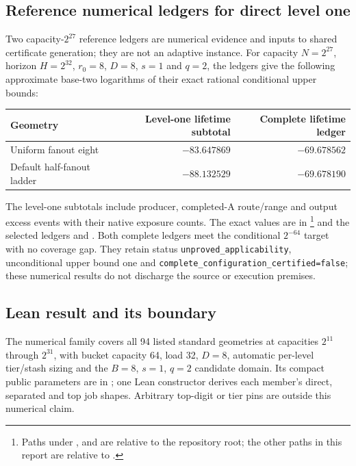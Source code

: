 \documentclass[11pt]{article}
\theoremstyle{definition}
\theoremstyle{remark}
\begin{document}
\subsection{Reference numerical ledgers for direct level one}
Two capacity-$2^{27}$ reference ledgers are numerical evidence and inputs
to shared certificate generation; they are not an adaptive instance.
For capacity $N=2^{27}$, horizon $H=2^{32}$, $r_0=8$, $D=8$, $s=1$
and $q=2$, the ledgers give the following approximate base-two
logarithms of their exact rational conditional upper bounds:
\begin{center}
\begin{tabular}{lrr}
\toprule
Geometry & Level-one lifetime subtotal & Complete lifetime ledger\\\midrule
Uniform fanout eight & $-83.647869$ & $-69.678562$\\
Default half-fanout ladder & $-88.132529$ & $-69.678190$\\
\bottomrule
\end{tabular}
\end{center}
The level-one subtotals include producer, completed-A route/range and output
excess events with their native exposure counts. The exact values are in
\footnote{Paths under ,
 and  are relative to the repository root; the other
paths in this report are relative to .} and the selected ledgers
 and
.
Both complete ledgers meet the conditional $2^{-64}$ target with no coverage
gap. They retain status \texttt{unproved\_applicability}, unconditional upper
bound one and \texttt{complete\_configuration\_certified=false}; these
numerical results do not discharge the source or execution premises.

\subsection{Lean result and its boundary}
\label{sec:lean-current}
The numerical family covers all 94 listed standard geometries at capacities
$2^{11}$ through $2^{31}$, with bucket capacity 64, load 32, $D=8$,
automatic per-level tier/stash sizing and the $B=8$, $s=1$, $q=2$ candidate
domain. Its compact public parameters are in
; one Lean
constructor derives each member's direct, separated and top job shapes.
Arbitrary top-digit or tier pins are outside this numerical claim.
\end{document}
